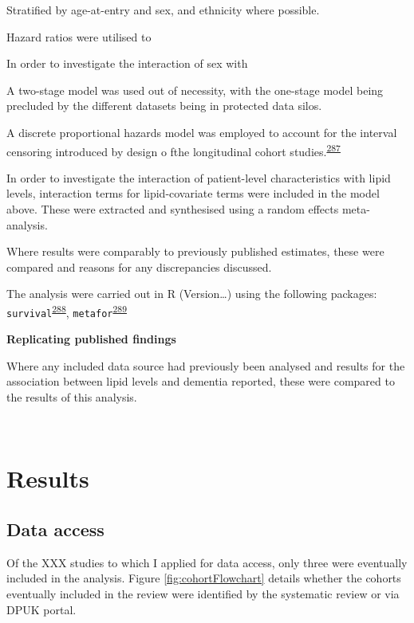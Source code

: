 \documentclass[a4paper, twoside]{templates/ociamthesis}
\begin{document}
Stratified by age-at-entry and sex, and ethnicity where possible.

Hazard ratios were utilised to

In order to investigate the interaction of sex with

A two-stage model was used out of necessity, with the one-stage model being precluded by the different datasets being in protected data silos.

A discrete proportional hazards model was employed to account for the interval censoring introduced by design o fthe longitudinal cohort studies.\textsuperscript{\protect\hyperlink{ref-wang2017}{287}}

In order to investigate the interaction of patient-level characteristics with lipid levels, interaction terms for lipid-covariate terms were included in the model above. These were extracted and synthesised using a random effects meta-analysis.

Where results were comparably to previously published estimates, these were compared and reasons for any discrepancies discussed.

The analysis were carried out in R (Version\ldots) using the following packages: \texttt{survival}\textsuperscript{\protect\hyperlink{ref-survival-book}{288}}, \texttt{metafor}\textsuperscript{\protect\hyperlink{ref-viechtbauer2010a}{289}}

\textbf{Replicating published findings}

Where any included data source had previously been analysed and results for the association between lipid levels and dementia reported, these were compared to the results of this analysis.

~

\hypertarget{results-2}{%
\section{Results}\label{results-2}}

\hypertarget{data-access}{%
\subsection{Data access}\label{data-access}}

Of the XXX studies to which I applied for data access, only three were eventually included in the analysis. Figure \ref{fig:cohortFlowchart} details whether the cohorts eventually included in the review were identified by the systematic review or via DPUK portal.
\end{document}
